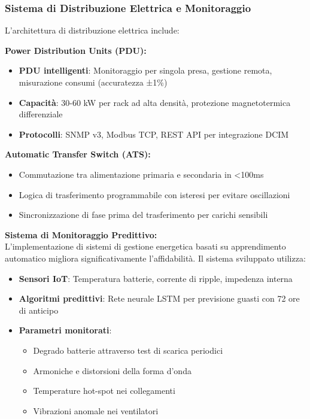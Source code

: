 \subsubsection{\texorpdfstring{\textbf{Sistema di Distribuzione Elettrica e Monitoraggio}}{3.2.1.2 - Sistema di Distribuzione Elettrica e Monitoraggio}}

L'architettura di distribuzione elettrica include:

\textbf{Power Distribution Units (PDU):}
\begin{itemize}
    \item \textbf{PDU intelligenti}: Monitoraggio per singola presa, gestione remota, misurazione consumi (accuratezza ±1\%)
    \item \textbf{Capacità}: 30-60 kW per rack ad alta densità, protezione magnetotermica differenziale
    \item \textbf{Protocolli}: SNMP v3, Modbus TCP, REST API per integrazione DCIM
\end{itemize}

\textbf{Automatic Transfer Switch (ATS):}
\begin{itemize}
    \item Commutazione tra alimentazione primaria e secondaria in <100ms
    \item Logica di trasferimento programmabile con isteresi per evitare oscillazioni
    \item Sincronizzazione di fase prima del trasferimento per carichi sensibili
\end{itemize}

\textbf{Sistema di Monitoraggio Predittivo:}\\
L'implementazione di sistemi di gestione energetica basati su apprendimento automatico migliora significativamente l'affidabilità\autocite{GoogleDeepMind2024}. Il sistema sviluppato utilizza:

\begin{itemize}
    \item \textbf{Sensori IoT}: Temperatura batterie, corrente di ripple, impedenza interna
    \item \textbf{Algoritmi predittivi}: Rete neurale LSTM per previsione guasti con 72 ore di anticipo
    \item \textbf{Parametri monitorati}: 
    \begin{itemize}
        \item Degrado batterie attraverso test di scarica periodici
        \item Armoniche e distorsioni della forma d'onda
        \item Temperature hot-spot nei collegamenti
        \item Vibrazioni anomale nei ventilatori
    \end{itemize}
\end{itemize}

